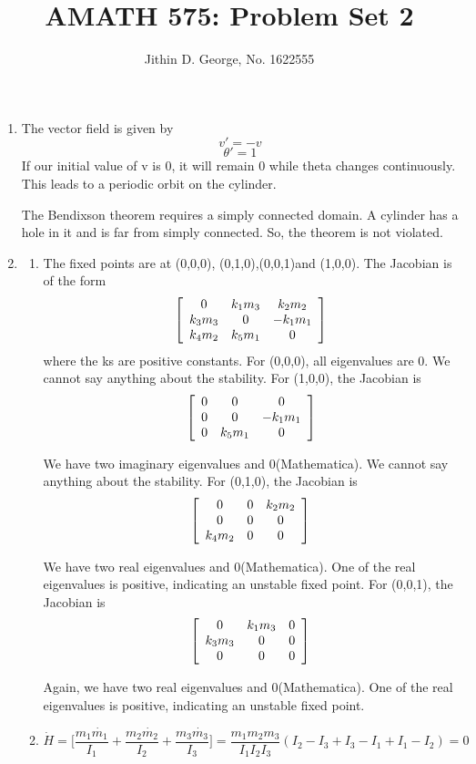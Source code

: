 \documentclass[a4paper,12pt]{article}
\title{AMATH 575: Problem Set 2}
\author{Jithin D. George, No. 1622555}
\newenvironment{mat}{\left[ \begin{array}{ccccccccccccc}}{\end{array}\right]}
\newcommand\bcm{\begin{mat}}
\newcommand\ecm{\end{mat}}
\begin{document}
\maketitle
\begin{enumerate}

	
	\item 
	The vector field is given by 
	\[v'=-v\]
	\[\theta' =1 \]
	If our initial value of v is 0, it will remain 0 while theta changes continuously. This leads to a periodic orbit on the cylinder.
	
	The Bendixson theorem requires a simply connected domain. A cylinder has a hole in it and is far from simply connected. So, the theorem is not violated.
	
\item 
\begin{enumerate}
	\item
	The fixed points are at (0,0,0), (0,1,0),(0,0,1)and (1,0,0).
	The Jacobian is of the form 
	\[\bcm 0 &k_1 m_3 &k_2 m_2 \\ k_3 m_3 &0 &- k_1 m_1 \\ k_4 m_2 &k_5 m_1 &0\ecm \]
	where the ks are positive constants.
	For (0,0,0), all eigenvalues are 0. We cannot say anything about the stability.
	For (1,0,0), the Jacobian is 
	\[\bcm 0 &0 &0 \\ 0 &0 &- k_1 m_1 \\ 0 &k_5 m_1 &0\ecm \]
	
	We have two imaginary eigenvalues and 0(Mathematica). We cannot say anything about the stability.
	For (0,1,0), the Jacobian is 
	\[\bcm 0 &0 &k_2 m_2 \\ 0 &0 &0 \\ k_4 m_2 &0 &0\ecm \]
	
	We have two real eigenvalues and 0(Mathematica). One of the real eigenvalues is positive, indicating an unstable fixed point.
For (0,0,1), the Jacobian is 
\[\bcm 0 &k_1 m_3 &0 \\ k_3m_3 &0 &0 \\ 0 &0 &0\ecm \]

Again, we have two real eigenvalues and 0(Mathematica). One of the real eigenvalues is positive, indicating an unstable fixed point.
	
	\item 
	
	\[\dot{H}= \bigg[\frac{m_1 \dot{m_1}}{I_1}+ \frac{m_2 \dot{m_2}}{I_2}+\frac{m_3 \dot{m_3}}{I_3} \bigg] = \frac{m_1 m_2 m_3}{I_1 I_2 I_3}(I_2-I_3 +I_3-I_1+I_1-I_2)  =0 \]
	

\end{enumerate}
\end{enumerate}
\end{document}
